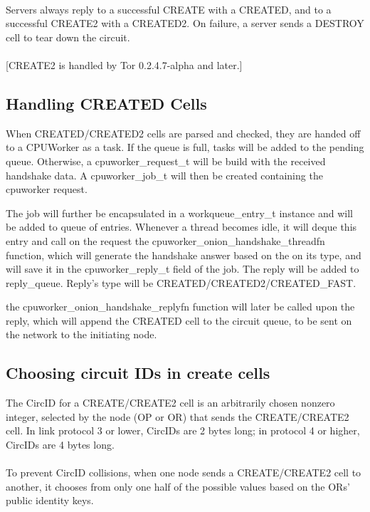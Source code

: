 \paragraph{}
Servers always reply to a successful CREATE with a CREATED, and to a
successful CREATE2 with a CREATED2. On failure, a server sends a
DESTROY cell to tear down the circuit.

\paragraph{}
[CREATE2 is handled by Tor 0.2.4.7-alpha and later.]

\subsection{Handling CREATED Cells}

When CREATED/CREATED2 cells are parsed and checked, they are handed off to a
CPUWorker as a task. If the queue is full, tasks will be added to the pending
queue. Otherwise, a cpuworker_request_t will be build with the received handshake
data. A cpuworker_job_t will then be created containing the cpuworker request.

The job will further be encapsulated in a workqueue\_entry\_t instance and will be
added to queue of entries. Whenever a thread becomes idle, it will deque this entry
and call on the request the cpuworker\_onion\_handshake\_threadfn function, which will
generate the handshake answer based on the on its type, and will save it in the
cpuworker\_reply\_t field of the job. The reply will be added to reply\_queue.
Reply's type will be CREATED/CREATED2/CREATED\_FAST.

the cpuworker_onion_handshake_replyfn function will later be called upon the reply, which
will append the CREATED cell to the circuit queue, to be sent on the network to the
initiating node.


\subsection{Choosing circuit IDs in create cells}
The CircID for a CREATE/CREATE2 cell is an arbitrarily chosen
nonzero integer, selected by the node (OP or OR) that sends the
CREATE/CREATE2 cell. In link protocol 3 or lower, CircIDs are 2
bytes long; in protocol 4 or higher, CircIDs are 4 bytes long.

\paragraph{}
To prevent CircID collisions, when one node sends a CREATE/CREATE2
cell to another, it chooses from only one half of the possible
values based on the ORs' public identity keys.

